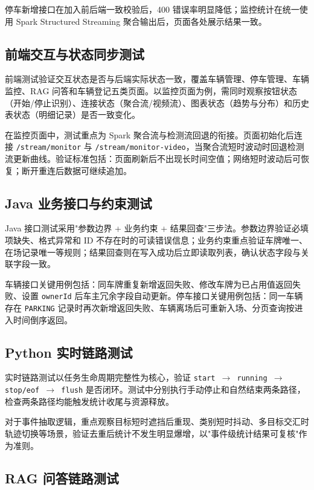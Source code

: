 \documentclass{wzuthesis} %
\begin{document}
停车新增接口在加入前后端一致校验后，400 错误率明显降低；监控统计在统一使用 Spark Structured Streaming 聚合输出后，页面各处展示结果一致。

\subsection{前端交互与状态同步测试}

前端测试验证交互状态是否与后端实际状态一致，覆盖车辆管理、停车管理、车辆监控、RAG 问答和车辆登记五类页面。以监控页面为例，需同时观察按钮状态（开始/停止识别）、连接状态（聚合流/视频流）、图表状态（趋势与分布）和历史表状态（明细记录）是否一致变化。

在监控页面中，测试重点为 Spark 聚合流与检测流回退的衔接。页面初始化后连接 \texttt{/stream/monitor} 与 \texttt{/stream/monitor-video}，当聚合流短时波动时回退检测流更新曲线。验证标准包括：页面刷新后不出现长时间空值；网络短时波动后可恢复；断开重连后数据可继续追加。

\subsection{Java 业务接口与约束测试}

Java 接口测试采用"参数边界 + 业务约束 + 结果回查"三步法。参数边界验证必填项缺失、格式异常和 ID 不存在时的可读错误信息；业务约束重点验证车牌唯一、在场记录唯一等规则；结果回查则在写入成功后立即读取列表，确认状态字段与关联字段一致。

车辆接口关键用例包括：同车牌重复新增返回失败、修改车牌为已占用值返回失败、设置 \texttt{ownerId} 后车主冗余字段自动更新。停车接口关键用例包括：同一车辆存在 \texttt{PARKING} 记录时再次新增返回失败、车辆离场后可重新入场、分页查询按进入时间倒序返回。

\subsection{Python 实时链路测试}

实时链路测试以任务生命周期完整性为核心，验证 \texttt{start $\rightarrow$ running $\rightarrow$ stop/eof $\rightarrow$ flush} 是否闭环。测试中分别执行手动停止和自然结束两条路径，检查两条路径均能触发统计收尾与资源释放。

对于事件抽取逻辑，重点观察目标短时遮挡后重现、类别短时抖动、多目标交汇时轨迹切换等场景，验证去重后统计不发生明显爆增，以"事件级统计结果可复核"作为准则。

\subsection{RAG 问答链路测试}
\end{document}
